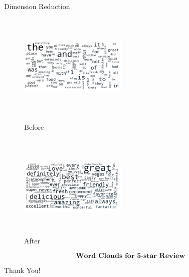 \documentclass[10pt]{beamer}
\begin{document}
\begin{frame}{Dimension Reduction}
\begin{figure}[htbp]
\centering
\begin{minipage}[t]{0.48\textwidth}
\centering
\includegraphics[width=5.1cm,height=5cm]{../image/dist5_ori.png}
\caption{Before}
\end{minipage}
\begin{minipage}[t]{0.48\textwidth}
\centering
\includegraphics[width=5.1cm,height=5cm]{../image/dist5_1.png}
\caption{After}
\end{minipage}
\end{figure}
$$\textbf{Word Clouds for 5-star Review}$$   
\end{frame}

\begin{frame}
\Huge{\centerline{Thank You!}}
\end{frame}
\end{document}
